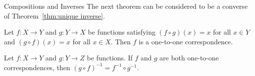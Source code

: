 \begin{section}{Compositions and Inverses}
The next theorem can be considered to be a converse of Theorem~\ref{thm:unique inverse}.

\begin{theorem}
Let $f:X\to Y$ and $g:Y\to X$ be functions satisfying $(f\circ g)(x)=x$ for all $x\in Y$ and $(g\circ f)(x)=x$ for all $x\in X$.  Then $f$ is a one-to-one correspondence.
\end{theorem}

\begin{theorem}
Let $f:X\to Y$ and $g:Y\to Z$ be functions.  If $f$ and $g$ are both one-to-one correspondences, then $(g\circ f)^{-1}=f^{-1}\circ g^{-1}$.
\end{theorem}

\end{section}